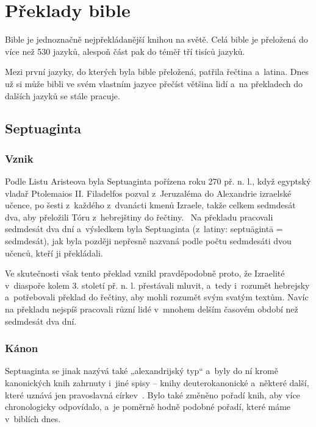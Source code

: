 \documentclass[a4rpaper,11pt,oneside]{article}
\begin{document}
\section{Překlady bible}

Bible je jednoznačně nejpřekládanější knihou na světě. Celá bible je přeložená do více než 530 jazyků, alespoň část pak do téměř tří tisíců jazyků.~\cite{wycliffe}

Mezi první jazyky, do kterých byla bible přeložená, patřila řečtina a~latina. Dnes už si může bibli ve svém vlastním jazyce přečíst většina lidí a~na překladech do dalších jazyků se stále pracuje.

\subsection{Septuaginta}

\subsubsection{Vznik}
Podle Listu Aristeova byla Septuaginta pořízena roku 270 př. n. l., když egyptský vladař Ptolemaios II. Filadelfos pozval z~Jeruzaléma do Alexandrie izraelské učence, po šesti z~každého z~dvanácti kmenů Izraele, takže celkem sedmdesát dva, aby přeložili Tóru z~hebrejštiny do řečtiny.~\cite{LXX}  Na překladu pracovali sedmdesát dva dní a~výsledkem byla Septuaginta (z~latiny: septuāgintā = sedmdesát), jak byla později nepřesně nazvaná podle počtu sedmdesáti dvou učenců, kteří ji překládali.

Ve skutečnosti však tento překlad vznikl pravděpodobně proto, že Izraelité v~diaspoře kolem 3. století př. n. l. přestávali mluvit, a~tedy i~rozumět hebrejsky a~potřebovali překlad do řečtiny, aby mohli rozumět svým svatým textům. Navíc na překladu nejspíš pracovali různí lidé v~mnohem delším časovém období než sedmdesát dva dní.

\subsubsection{Kánon}
Septuaginta se jinak nazývá také „alexandrijský typ“ a~byly do ní kromě kanonických knih zahrnuty i~jiné spisy – knihy deuterokanonické a~některé další, které uznává jen pravoslavná církev~\cite{kanon}. Bylo také změněno pořadí knih, aby více chronologicky odpovídalo, a~je poměrně hodně podobné pořadí, které máme v~biblích dnes.
\end{document}
